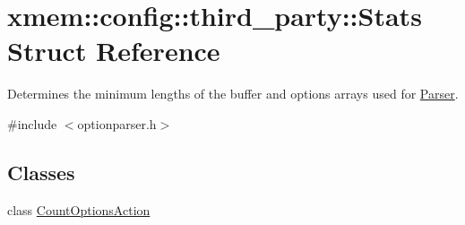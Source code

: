 \hypertarget{structxmem_1_1config_1_1third__party_1_1_stats}{}\section{xmem\+:\+:config\+:\+:third\+\_\+party\+:\+:Stats Struct Reference}
\label{structxmem_1_1config_1_1third__party_1_1_stats}


Determines the minimum lengths of the buffer and options arrays used for \hyperlink{classxmem_1_1config_1_1third__party_1_1_parser}{Parser}.  




{\ttfamily \#include $<$optionparser.\+h$>$}

\subsection*{Classes}
\begin{DoxyCompactItemize}
\item 
class \hyperlink{classxmem_1_1config_1_1third__party_1_1_stats_1_1_count_options_action}{Count\+Options\+Action}
\end{DoxyCompactItemize}
